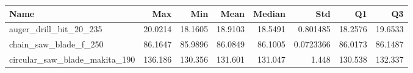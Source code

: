 \begin{tabular}{lrrrrrrr}
\hline
 Name                          &      Max &      Min &     Mean &   Median &       Std &       Q1 &       Q3 \\
\hline
 auger\_drill\_bit\_20\_235        &  20.0214 &  18.1605 &  18.9103 &  18.5491 & 0.801485  &  18.2576 &  19.6533 \\
 chain\_saw\_blade\_f\_250         &  86.1647 &  85.9896 &  86.0849 &  86.1005 & 0.0723366 &  86.0173 &  86.1487 \\
 circular\_saw\_blade\_makita\_190 & 136.186  & 130.356  & 131.601  & 131.047  & 1.448     & 130.538  & 132.337  \\
\hline
\end{tabular}